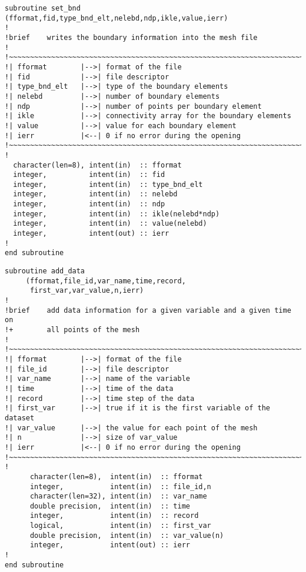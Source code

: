 %
\begin{lstlisting}
subroutine set_bnd (fformat,fid,type_bnd_elt,nelebd,ndp,ikle,value,ierr)
!
!brief    writes the boundary information into the mesh file
!
!~~~~~~~~~~~~~~~~~~~~~~~~~~~~~~~~~~~~~~~~~~~~~~~~~~~~~~~~~~~~~~~~~~~~~~~
!| fformat        |-->| format of the file
!| fid            |-->| file descriptor
!| type_bnd_elt   |-->| type of the boundary elements
!| nelebd         |-->| number of boundary elements
!| ndp            |-->| number of points per boundary element
!| ikle           |-->| connectivity array for the boundary elements
!| value          |-->| value for each boundary element
!| ierr           |<--| 0 if no error during the opening
!~~~~~~~~~~~~~~~~~~~~~~~~~~~~~~~~~~~~~~~~~~~~~~~~~~~~~~~~~~~~~~~~~~~~~~~
!
  character(len=8), intent(in)  :: fformat
  integer,          intent(in)  :: fid
  integer,          intent(in)  :: type_bnd_elt
  integer,          intent(in)  :: nelebd
  integer,          intent(in)  :: ndp
  integer,          intent(in)  :: ikle(nelebd*ndp)
  integer,          intent(in)  :: value(nelebd)
  integer,          intent(out) :: ierr
!
end subroutine
\end{lstlisting}
%
\begin{lstlisting}
subroutine add_data
     (fformat,file_id,var_name,time,record,
      first_var,var_value,n,ierr)
!
!brief    add data information for a given variable and a given time on
!+        all points of the mesh
!
!~~~~~~~~~~~~~~~~~~~~~~~~~~~~~~~~~~~~~~~~~~~~~~~~~~~~~~~~~~~~~~~~~~~~~~~
!| fformat        |-->| format of the file
!| file_id        |-->| file descriptor
!| var_name       |-->| name of the variable
!| time           |-->| time of the data
!| record         |-->| time step of the data
!| first_var      |-->| true if it is the first variable of the dataset
!| var_value      |-->| the value for each point of the mesh
!| n              |-->| size of var_value
!| ierr           |<--| 0 if no error during the opening
!~~~~~~~~~~~~~~~~~~~~~~~~~~~~~~~~~~~~~~~~~~~~~~~~~~~~~~~~~~~~~~~~~~~~~~~
!
      character(len=8),  intent(in)  :: fformat
      integer,           intent(in)  :: file_id,n
      character(len=32), intent(in)  :: var_name
      double precision,  intent(in)  :: time
      integer,           intent(in)  :: record
      logical,           intent(in)  :: first_var
      double precision,  intent(in)  :: var_value(n)
      integer,           intent(out) :: ierr
!
end subroutine
\end{lstlisting}

%
